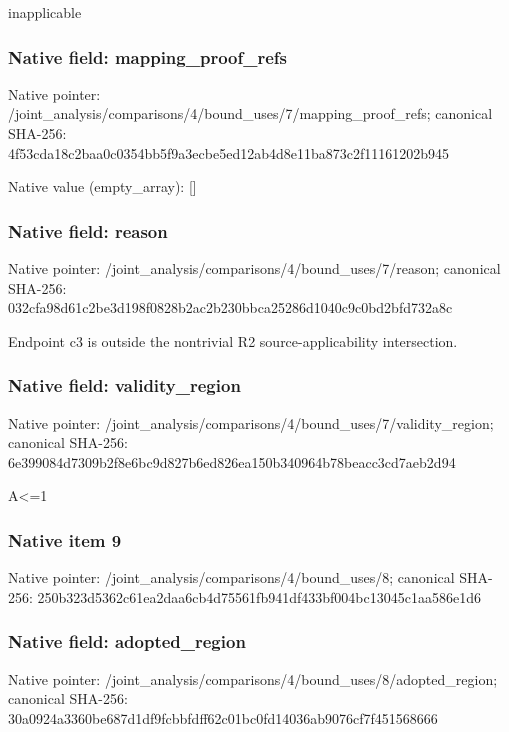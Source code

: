 \documentclass[10pt,a4paper]{article}
\begin{document}
\begingroup\raggedright\sloppy inapplicable\par\endgroup

\subsubsection{Native field: mapping\_\allowbreak{}proof\_\allowbreak{}refs}
Native pointer: /joint\_\allowbreak{}analysis/comparisons/4/bound\_\allowbreak{}uses/7/mapping\_\allowbreak{}proof\_\allowbreak{}refs; canonical SHA-256: 4f53cda18c2baa0c0354bb5f9a3ecbe5ed12ab4d8e11ba873c2f11161202b945

Native value (empty\_\allowbreak{}array): []

\subsubsection{Native field: reason}
Native pointer: /joint\_\allowbreak{}analysis/comparisons/4/bound\_\allowbreak{}uses/7/reason; canonical SHA-256: 032cfa98d61c2be3d198f0828b2ac2b230bbca25286d1040c9c0bd2bfd732a8c

\begingroup\raggedright\sloppy Endpoint c3 is outside the nontrivial R2 source-applicability intersection.\par\endgroup

\subsubsection{Native field: validity\_\allowbreak{}region}
Native pointer: /joint\_\allowbreak{}analysis/comparisons/4/bound\_\allowbreak{}uses/7/validity\_\allowbreak{}region; canonical SHA-256: 6e399084d7309b2f8e6bc9d827b6ed826ea150b340964b78beacc3cd7aeb2d94

\begingroup\raggedright\sloppy A<=\allowbreak{}1\par\endgroup

\subsubsection{Native item 9}
Native pointer: /joint\_\allowbreak{}analysis/comparisons/4/bound\_\allowbreak{}uses/8; canonical SHA-256: 250b323d5362c61ea2daa6cb4d75561fb941df433bf004bc13045c1aa586e1d6

\subsubsection{Native field: adopted\_\allowbreak{}region}
Native pointer: /joint\_\allowbreak{}analysis/comparisons/4/bound\_\allowbreak{}uses/8/adopted\_\allowbreak{}region; canonical SHA-256: 30a0924a3360be687d1df9fcbbfdff62c01bc0fd14036ab9076cf7f451568666
\end{document}
